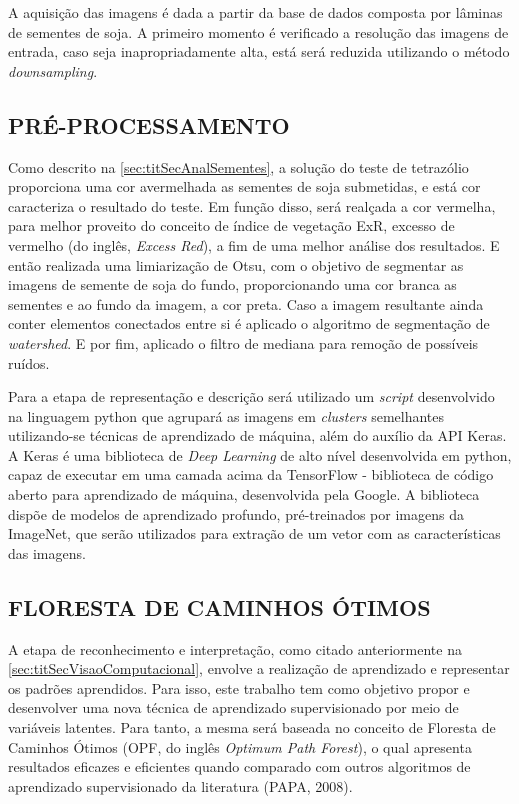 A aquisição das imagens é dada a partir da base de dados composta por lâminas de sementes de soja. A primeiro momento é verificado a resolução das imagens de entrada, caso seja inapropriadamente alta, está será reduzida utilizando o método \textit{downsampling}.

\subsection{PRÉ-PROCESSAMENTO}
\label{sec:titSubSecPreProcessamento}

Como descrito na \autoref{sec:titSecAnalSementes}, a solução do teste de tetrazólio proporciona uma cor avermelhada as sementes de soja submetidas, e está cor caracteriza o resultado do teste. Em função disso, será realçada a cor vermelha, para melhor proveito do conceito de índice de vegetação ExR, excesso de vermelho (do inglês, \textit{Excess Red}), a fim de uma melhor análise dos resultados. E então realizada uma limiarização de Otsu, com o objetivo de segmentar as imagens de semente de soja do fundo, proporcionando uma cor branca as sementes e ao fundo da imagem, a cor preta. Caso a imagem resultante ainda conter elementos conectados entre si é aplicado o algoritmo de segmentação de \textit{watershed}. E por fim, aplicado o filtro de mediana para remoção de possíveis ruídos.

Para a etapa de representação e descrição será utilizado um \textit{script} desenvolvido na linguagem python que agrupará as imagens em \textit{clusters} semelhantes utilizando-se técnicas de aprendizado de máquina, além do auxílio da API Keras. A Keras é uma biblioteca de \textit{Deep Learning} de alto nível desenvolvida em python, capaz de executar em uma camada acima da TensorFlow - biblioteca de código aberto para aprendizado de máquina, desenvolvida pela Google. A biblioteca dispõe de modelos de aprendizado profundo, pré-treinados por imagens da ImageNet, que serão utilizados para extração de um vetor com as características das imagens.

\subsection{FLORESTA DE CAMINHOS ÓTIMOS}
\label{sec:titSubSecOPF}

A etapa de reconhecimento e interpretação, como citado anteriormente na \autoref{sec:titSecVisaoComputacional}, envolve a realização de aprendizado e representar os padrões aprendidos. Para isso, este trabalho tem como objetivo propor e desenvolver uma nova técnica de aprendizado supervisionado por meio de variáveis latentes. Para tanto, a mesma será baseada no conceito de Floresta de Caminhos Ótimos (OPF, do inglês \textit{Optimum Path Forest}), o qual apresenta resultados eficazes e eficientes quando comparado com outros algoritmos de aprendizado supervisionado da literatura (PAPA, 2008).

